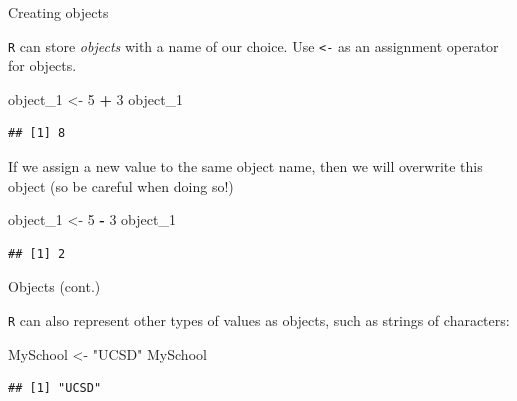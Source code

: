 \documentclass[ignorenonframetext,]{beamer}
\newenvironment{Shaded}{\begin{snugshade}}{\end{snugshade}}
\newcommand{\DecValTok}[1]{\textcolor[rgb]{0.00,0.00,0.81}{#1}}
\newcommand{\StringTok}[1]{\textcolor[rgb]{0.31,0.60,0.02}{#1}}
\newcommand{\OperatorTok}[1]{\textcolor[rgb]{0.81,0.36,0.00}{\textbf{#1}}}
\newcommand{\NormalTok}[1]{#1}
\begin{document}
\begin{frame}[fragile]{Creating objects}

\texttt{R} can store \emph{objects} with a name of our choice. Use
\texttt{\textless{}-} as an assignment operator for objects.

\begin{Shaded}
\begin{Highlighting}[]
\NormalTok{object_}\DecValTok{1}\NormalTok{ <-}\StringTok{ }\DecValTok{5} \OperatorTok{+}\StringTok{ }\DecValTok{3}
\NormalTok{object_}\DecValTok{1}
\end{Highlighting}
\end{Shaded}

\begin{verbatim}
## [1] 8
\end{verbatim}

If we assign a new value to the same object name, then we will overwrite
this object (so be careful when doing so!)

\begin{Shaded}
\begin{Highlighting}[]
\NormalTok{object_}\DecValTok{1}\NormalTok{ <-}\StringTok{ }\DecValTok{5} \OperatorTok{-}\StringTok{ }\DecValTok{3}
\NormalTok{object_}\DecValTok{1}
\end{Highlighting}
\end{Shaded}

\begin{verbatim}
## [1] 2
\end{verbatim}

\end{frame}

\begin{frame}[fragile]{Objects (cont.)}

\texttt{R} can also represent other types of values as objects, such as
strings of characters:

\begin{Shaded}
\begin{Highlighting}[]
\NormalTok{MySchool <-}\StringTok{ "UCSD"}
\NormalTok{MySchool}
\end{Highlighting}
\end{Shaded}

\begin{verbatim}
## [1] "UCSD"
\end{verbatim}

\end{frame}
\end{document}
